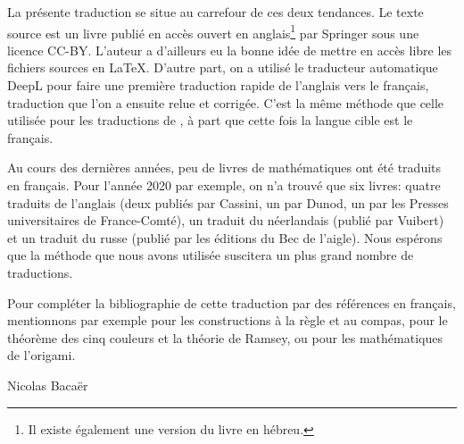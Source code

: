 La présente traduction se situe au carrefour de ces deux tendances. Le texte source est un livre publié en accès ouvert en anglais\footnote{Il existe également une version du livre en hébreu.}  par Springer sous une licence CC-BY. L'auteur a d'ailleurs eu la bonne idée de mettre en accès libre les fichiers sources en \LaTeX{}. D'autre part, on a utilisé le traducteur automatique DeepL pour faire une première traduction rapide de l'anglais vers le français, traduction que l'on a ensuite relue et corrigée. C'est la même méthode que celle utilisée pour les traductions de \cite{Bacaer,Bacaer2}, à part que cette fois la langue cible est le français.

 Au cours des dernières années, peu de livres de mathématiques ont été traduits en français. Pour l'année 2020 par exemple, on n'a trouvé que six livres: quatre    traduits de l'anglais (deux publiés par Cassini, un par Dunod, un par les Presses universitaires de France-Comté), un traduit du néerlandais (publié par Vuibert) et un  traduit du russe (publié par les éditions du Bec de l'aigle). Nous espérons que la méthode que nous avons utilisée suscitera un plus grand nombre de traductions.

Pour compléter la bibliographie de cette traduction par des références en français, mentionnons par exemple \cite{Carrega,Lafforgue} pour les constructions à la règle et au compas, \cite{Aassila,Gowers} pour le théorème des cinq couleurs et  la théorie de Ramsey, ou \cite{Delahaye} pour les mathématiques de l'origami.

\medskip

\begin{flushright}
{Nicolas Bacaër}
\end{flushright}

\newpage

\rhead[\fancyplain{}{}]%
{\fancyplain{}{\thepage}}
\cfoot{}
\pagestyle{fancyplain}

\tableofcontents

